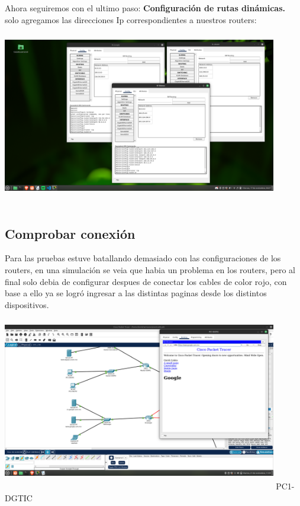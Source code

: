 \documentclass[14pt]{book}
\begin{document}
Ahora seguiremos con el ultimo paso: \textbf{Configuración de rutas dinámicas.}\\

solo agregamos las direcciones Ip correspondientes a nuestros routers:\\

\includegraphics[width=12cm, height=8cm]{images/ip correspondienrs.png}\\

{\color{red} \subsection*{\textbf{Comprobar conexión}}}
\vspace{1em}

Para las pruebas estuve batallando demasiado con las configuraciones de los routers, en una simulación se veia que habia un problema en los routers, pero al final solo debia de configurar despues de conectar los cables de color rojo,
con base a ello ya se logró ingresar a las distintas paginas desde los distintos dispositivos.\\


\includegraphics[width=12cm, height=8cm]{images/prueba1siiiiiiiii.png} PC1-DGTIC\\
\end{document}
